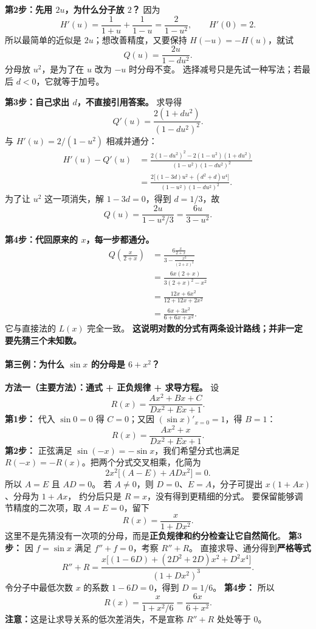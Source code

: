 \begin{proofbox}
\textbf{第2步：先用 $2u$，为什么分子放 $2$？}
因为
\[
 H'(u)=\frac1{1+u}+\frac1{1-u}=\frac2{1-u^2},
 \qquad H'(0)=2.
\]
所以最简单的近似是 $2u$；想改善精度，又要保持 $H(-u)=-H(u)$，就试
\[
 Q(u)=\frac{2u}{1-du^2}.
\]
分母放 $u^2$，是为了在 $u$ 改为 $-u$ 时分母不变。
选择减号只是先试一种写法；若最后 $d<0$，它就等于加号。

\textbf{第3步：自己求出 $d$，不直接引用答案。}
求导得
\[
 Q'(u)=\frac{2(1+du^2)}{(1-du^2)^2}.
\]
与 $H'(u)=2/(1-u^2)$ 相减并通分：
\[
 \begin{aligned}
 H'(u)-Q'(u)
 &=\frac{2(1-du^2)^2-2(1-u^2)(1+du^2)}
 {(1-u^2)(1-du^2)^2}\\
 &=\frac{2\bigl[(1-3d)u^2+(d^2+d)u^4\bigr]}
 {(1-u^2)(1-du^2)^2}.
 \end{aligned}
\]
为了让 $u^2$ 这一项消失，解 $1-3d=0$，得到 $d=1/3$，故
\[
 Q(u)=\frac{2u}{1-u^2/3}=\frac{6u}{3-u^2}.
\]

\textbf{第4步：代回原来的 $x$，每一步都通分。}
\[
 \begin{aligned}
 Q\!\left(\frac{x}{2+x}\right)
 &=\frac{6\frac{x}{2+x}}{3-\frac{x^2}{(2+x)^2}}\\
 &=\frac{6x(2+x)}{3(2+x)^2-x^2}\\
 &=\frac{12x+6x^2}{12+12x+2x^2}\\
 &=\boxed{\frac{6x+3x^2}{6+6x+x^2}}.
 \end{aligned}
\]
它与直接法的 $L(x)$ 完全一致。
\textbf{这说明对数的分式有两条设计路线；并非一定要先猜三个未知数。}

\paragraph{第三例：为什么 $\sin x$ 的分母是 $6+x^2$？}

\medskip
\noindent\textbf{方法一（主要方法）：通式 + 正负规律 + 求导方程。}
设
\[
 R(x)=\frac{Ax^2+Bx+C}{Dx^2+Ex+1}.
\]
\textbf{第1步：} 代入 $\sin0=0$ 得 $C=0$；又因 $(\sin x)'_{x=0}=1$，得 $B=1$：
\[
 R(x)=\frac{Ax^2+x}{Dx^2+Ex+1}.
\]
\textbf{第2步：} 正弦满足 $\sin(-x)=-\sin x$，我们希望分式也满足
$R(-x)=-R(x)$。把两个分式交叉相乘，化简为
\[
 2x^2\bigl[(A-E)+ADx^2\bigr]=0.
\]
所以 $A=E$ 且 $AD=0$。
若 $A\ne0$，则 $D=0$、$E=A$，分子可提出 $x(1+Ax)$、分母为 $1+Ax$，
约分后只是 $R=x$，没有得到更精细的分式。
要保留能够调节精度的二次项，取 $A=E=0$，留下
\[
 R(x)=\frac{x}{1+Dx^2}.
\]
这里不是先猜没有一次项的分母，而是\textbf{正负规律和约分检查让它自然简化}。
\textbf{第3步：} 因 $f=\sin x$ 满足 $f''+f=0$，考察 $R''+R$。
直接求导、通分得到\textbf{严格等式}
\[
 R''+R=\frac{x\bigl[(1-6D)+(2D^2+2D)x^2+D^2x^4\bigr]}
 {(1+Dx^2)^3}.
\]
令分子中最低次数 $x$ 的系数 $1-6D=0$，得到 $D=1/6$。
\textbf{第4步：} 所以
\[
 \boxed{R(x)=\frac{x}{1+x^2/6}=\frac{6x}{6+x^2}}.
\]
\textbf{注意：}这是让求导关系的低次差消失，不是宣称 $R''+R$ 处处等于 $0$。


\end{proofbox}

